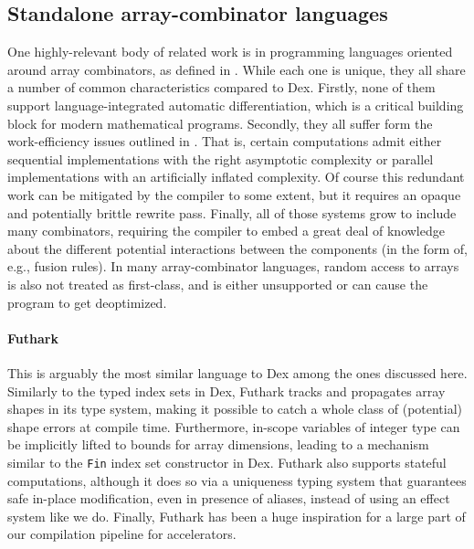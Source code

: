 \documentclass[acmsmall,screen,nonacm]{acmart}
\begin{document}
\iffalse
\subsection{Standalone array-combinator languages}
\label{sec:standalone-array-langauges}

One highly-relevant body of related work is in programming languages oriented around array combinators, as defined in .
While each one is unique, they all share a number of common characteristics compared to Dex.
Firstly, none of them support language-integrated automatic differentiation, which is a critical building block for modern mathematical programs.
Secondly, they all suffer form the work-efficiency issues outlined in .
That is, certain computations admit either sequential implementations with the right asymptotic complexity or parallel implementations with an artificially inflated complexity.
Of course this redundant work can be mitigated by the compiler to some extent, but it requires an opaque and potentially brittle rewrite pass.
Finally, all of those systems grow to include many combinators, requiring the compiler to embed a great deal of knowledge about the different potential interactions between the components (in the form of, e.g., fusion rules).
In many array-combinator languages, random access to arrays is also not treated as first-class, and is either unsupported or can cause the program to get deoptimized.

\paragraph{Futhark \cite{henriksen2017futhark}}
\label{sec:futhark}
This is arguably the most similar language to Dex among the ones discussed here.
Similarly to the typed index sets in Dex, Futhark tracks and propagates array shapes in its type system, making it possible to catch a whole class of (potential) shape errors at compile time.
Furthermore, in-scope variables of integer type can be implicitly lifted to bounds for array dimensions, leading to a mechanism similar to the \texttt{Fin} index set constructor in Dex.
Futhark also supports stateful computations, although it does so via a uniqueness typing system that guarantees safe in-place modification, even in presence of aliases, instead of using an effect system like we do.
Finally, Futhark has been a huge inspiration for a large part of our compilation pipeline for accelerators.
\end{document}
